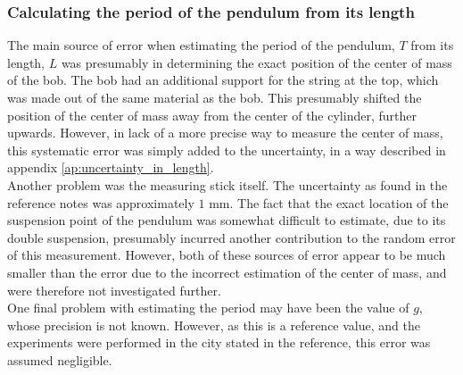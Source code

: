 \documentclass[a4paper, 10pt]{article}
\begin{document}
\subsubsection{Calculating the period of the pendulum from its length}\label{pendulum_support}
The main source of error when estimating the period of the pendulum, $T$ from its length, $L$ was presumably in determining the exact position of the center of mass of the bob. The bob had an additional support for the string at the top, which was made out of the same material as the bob. This presumably shifted the position of the center of mass away from the center of the cylinder, further upwards. However, in lack of a more precise way to measure the center of mass, this systematic error was simply added to the uncertainty, in a way described in appendix \ref{ap:uncertainty_in_length}.\\
\linebreak
Another problem was the measuring stick itself. The uncertainty as found in the reference notes was approximately $1$ mm. The fact that the exact location of the suspension point of the pendulum was somewhat difficult to estimate, due to its double suspension, presumably incurred another contribution to the random error of this measurement. However, both of these sources of error appear to be much smaller than the error due to the incorrect estimation of the center of mass, and were therefore not investigated further.\\
\linebreak
One final problem with estimating the period may have been the value of $g$, whose precision is not known. However, as this is a reference value, and the experiments were performed in the city stated in the reference, this error was assumed negligible.
\end{document}
